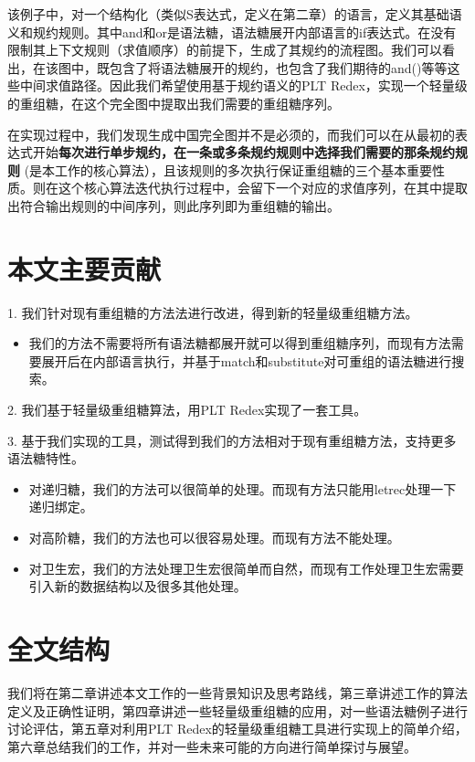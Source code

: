 该例子中，对一个结构化（类似S表达式，定义在第二章）的语言，定义其基础语义和规约规则。其中and和or是语法糖，语法糖展开内部语言的if表达式。在没有限制其上下文规则（求值顺序）的前提下，生成了其规约的流程图。我们可以看出，在该图中，既包含了将语法糖展开的规约，也包含了我们期待的and()等等这些中间求值路径。因此我们希望使用基于规约语义的PLT Redex，实现一个轻量级的重组糖，在这个完全图中提取出我们需要的重组糖序列。

在实现过程中，我们发现生成中国完全图并不是必须的，而我们可以在从最初的表达式开始{\bfseries 每次进行单步规约，在一条或多条规约规则中选择我们需要的那条规约规则 }(是本工作的核心算法），且该规则的多次执行保证重组糖的三个基本重要性质。则在这个核心算法迭代执行过程中，会留下一个对应的求值序列，在其中提取出符合输出规则的中间序列，则此序列即为重组糖的输出。


\section{本文主要贡献}
\begin{flushleft}
	1.	我们针对现有重组糖的方法法进行改进，得到新的轻量级重组糖方法。
\end{flushleft}

\begin{itemize}
	\item 我们的方法不需要将所有语法糖都展开就可以得到重组糖序列，而现有方法需要展开后在内部语言执行，并基于match和substitute对可重组的语法糖进行搜索。
	
\end{itemize}

\begin{flushleft}
	2.	我们基于轻量级重组糖算法，用PLT Redex实现了一套工具。
\end{flushleft}
\begin{flushleft}
	3.	基于我们实现的工具，测试得到我们的方法相对于现有重组糖方法，支持更多语法糖特性。
\end{flushleft}

\begin{itemize}
	\item 对递归糖，我们的方法可以很简单的处理。而现有方法只能用letrec处理一下递归绑定。
	\item 对高阶糖，我们的方法也可以很容易处理。而现有方法不能处理。
	\item 对卫生宏，我们的方法处理卫生宏很简单而自然，而现有工作处理卫生宏需要引入新的数据结构以及很多其他处理。
\end{itemize}

\section{全文结构}

我们将在第二章讲述本文工作的一些背景知识及思考路线，第三章讲述工作的算法定义及正确性证明，第四章讲述一些轻量级重组糖的应用，对一些语法糖例子进行讨论评估，第五章对利用PLT Redex的轻量级重组糖工具进行实现上的简单介绍，第六章总结我们的工作，并对一些未来可能的方向进行简单探讨与展望。
